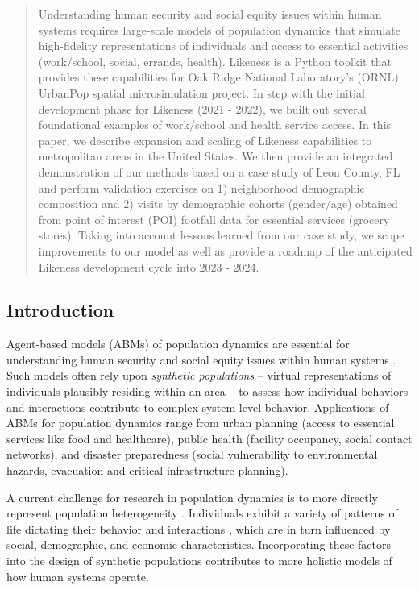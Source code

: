 \begin{abstract}
    Understanding human security and social equity issues within human systems requires large-scale models of population dynamics that simulate high-fidelity representations of individuals and access to essential activities (work/school, social, errands, health). Likeness is a Python toolkit that provides these capabilities for Oak Ridge National Laboratory's (ORNL) UrbanPop spatial microsimulation project. In step with the initial development phase for Likeness (2021 - 2022), we built out several foundational examples of work/school and health service access. In this paper, we describe expansion and scaling of Likeness capabilities to metropolitan areas in the United States. We then provide an integrated demonstration of our methods based on a case study of Leon County, FL and perform validation exercises on 1) neighborhood demographic composition and 2) visits by demographic cohorts (gender/age) obtained from point of interest (POI) footfall data for essential services (grocery stores). Taking into account lessons learned from our case study, we scope improvements to our model as well as provide a roadmap of the anticipated Likeness development cycle into 2023 - 2024.
\end{abstract}

\subsection{Introduction}\label{introduction}

Agent-based models (ABMs) of population dynamics are essential for understanding human security and social equity issues within human systems \cite{germann2022assessing, ozik2021population, urbanpop-AG-2023}. Such models often rely upon \emph{synthetic populations} -- virtual representations of individuals plausibly residing within an area -- to assess how individual behaviors and interactions contribute to complex system-level behavior. Applications of ABMs for population dynamics range from urban planning (access to essential services like food and healthcare), public health (facility occupancy, social contact networks), and disaster preparedness (social vulnerability to environmental hazards, evacuation and critical infrastructure planning).

A current challenge for research in population dynamics is to more directly represent population heterogeneity \cite{BRaVE_DOE_2022}. Individuals exhibit a variety of patterns of life dictating their behavior and interactions \cite{pappalardo2015returners}, which are in turn influenced by social, demographic, and economic characteristics. Incorporating these factors into the design of synthetic populations contributes to more holistic models of how human systems operate.

